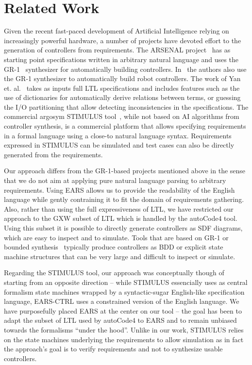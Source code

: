 \section{Related Work}
\vspace{-.4cm}Given the recent fast-paced development of Artificial Intelligence
relying on increasingly powerful hardware, a number of projects have devoted
effort to the generation of controllers from requirements. The ARSENAL
project~\cite{ghosh2016arsenal} has as starting point specifications written in
arbitrary natural language and uses the GR-1~\cite{piterman2006synthesis}
synthesizer for automatically building controllers. In~\cite{YanCC15} the
authors also use the GR-1 synthesizer to automatically build robot
controllers. The work of Yan et. al.~\cite{YanCC15} takes as inputs full LTL
specifications and includes features such as the use of dictionaries for
automatically derive relations between terms, or guessing the I/O partitioning
that allow detecting inconsistencies in the specifications. The commercial
argosym STIMULUS tool~\cite{jeannet16}, while not based on AI algorithms from controller
synthesis, is a commercial platform that allows specifying requirements in a
formal language using a close-to natural language syntax. Requirements expressed
in STIMULUS can be simulated and test cases can also be directly generated from
the requirements.

Our approach differs from the GR-1-based projects mentioned above in the sense
that we do not aim at applying pure natural language parsing to arbitrary
requirements. Using EARS allows us to provide the readability of the English
language while gently contraining it to fit the domain of requirements
gathering. Also, rather than using the full expressiveness of LTL, we have
restricted our approach to the \textsf{GXW} subset of LTL which is handled by
the \textsf{autoCode4} tool. Using this subset it is possible to directly
generate controllers as SDF diagrams, which are easy to inspect and to simulate.
Tools that are based on GR-1 or bounded synthesis~\cite{schewe2007bounded}
typically produce controllers as BDD or explicit state machine structures that
can be very large and difficult to inspect or simulate.

Regarding the STIMULUS tool, our approach was conceptually though of starting
from an opposite direction -- while STIMULUS essencially uses as central
formalism state machines wrapped by a syntactic-sugar English-like specification
language, \textsf{EARS-CTRL} uses a constrained version of the English language.
We have purposefully placed EARS at the center on our tool -- the goal has been
to adapt the subset of LTL used by \textsf{autoCode4} to EARS and to remain
unbiased towards the formalisms ``under the hood''. Unlike in our work, STIMULUS
relies on the state machines underlying the requirements to allow simulation as
in fact the approach's goal is to verify requirements and not to synthesize
usable controllers.\vspace{-.5cm}

